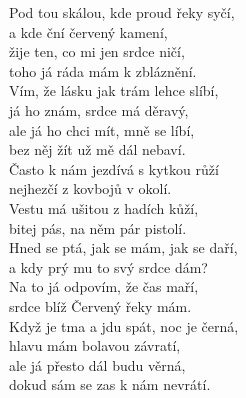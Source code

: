 
Pod tou skálou, kde proud řeky syčí,\\
a kde ční červený kamení,\hspace{0,5cm} \\
žije ten, co mi jen srdce ničí,\\
toho já ráda mám k zbláznění.\\

Vím, že lásku jak trám lehce slíbí,\\
já ho znám, srdce má děravý,\\
ale já ho chci mít, mně se líbí,\\
bez něj žít už mě dál nebaví.\\

Často k nám jezdívá s kytkou růží\\
nejhezčí z kovbojů v okolí.\\
Vestu má ušitou z hadích kůží,\\
bitej pás, na něm pár pistolí.\\

Hned se ptá, jak se mám, jak se daří,\\
a kdy prý mu to svý srdce dám?\\
Na to já odpovím, že čas maří,\\
srdce blíž Červený řeky mám.\\

Když je tma a jdu spát, noc je černá,\\
hlavu mám bolavou závratí,\\
ale já přesto dál budu věrná,\\
dokud sám se zas k nám nevrátí.

\newpage
